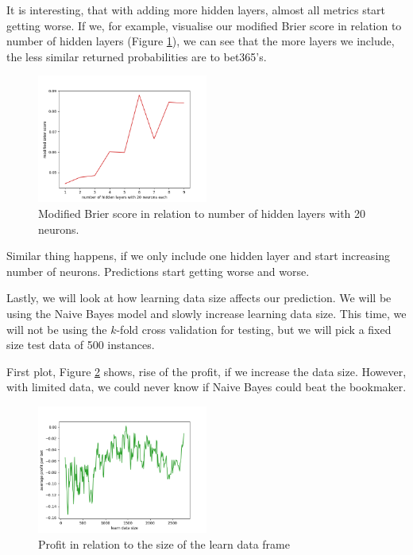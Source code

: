 \documentclass[conference]{IEEEtran}
\begin{document}
It is interesting, that with adding more hidden layers, almost all metrics start getting worse.
If we, for example, visualise our modified Brier score in relation to number of hidden layers 
(Figure \ref{mbs-mlp}), we can see that the more layers we include, the less similar
returned probabilities are to bet365's.

\begin{figure}[!ht]
\includegraphics[width=0.5\textwidth]{mbs_layers_mlp.png}
\caption{Modified Brier score in relation to number of hidden layers with 20 neurons.}
\label{mbs-mlp}
\end{figure}

Similar thing happens, if we only include one hidden layer and start increasing number
of neurons. Predictions start getting worse and worse.

Lastly, we will look at how learning data size affects our prediction. We will be using the 
Naive Bayes model and slowly increase learning data size. This time, we will not be using 
the $k$-fold cross validation for testing, but we will pick a fixed size test data of 500
instances.

First plot, Figure \ref{data_size_profit} shows, rise of the profit, if we increase the data
size. However, with limited data, we could never know if Naive Bayes could beat the bookmaker.

\begin{figure}[!ht]
\includegraphics[width=0.5\textwidth]{profit-data_size.png}
\caption{Profit in relation to the size of the learn data frame}
\label{data_size_profit}
\end{figure}
\end{document}
